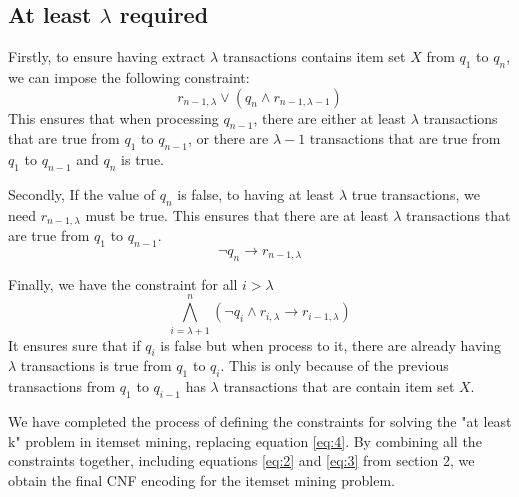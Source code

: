 \subsection{At least $\lambda$ required}

Firstly, to ensure having extract $\lambda$ transactions contains item set $X$ from $q_1$ to $q_n$, we can impose the following constraint:
\begin{equation}
    r_{n-1,\lambda} \vee (q_n \wedge r_{n-1,\lambda-1})
\end{equation}
This ensures that when processing $q_{n-1}$, there are either at least $\lambda$ transactions that are true from $q_1$ to $q_{n-1}$,
or there are $\lambda - 1$ transactions that are true from $q_1$ to $q_{n-1}$ and $q_n$ is true.

Secondly, If the value of $q_n$ is false, to having at least $\lambda$ true transactions,
we need $r_{n-1,\lambda}$ must be true.
This ensures that there are at least $\lambda$ transactions that are true from $q_1$ to $q_{n-1}$.
\begin{equation}
    \neg q_n \rightarrow r_{n-1,\lambda}
\end{equation}

Finally, we have the constraint for all $i > \lambda$
\begin{equation}
    \bigwedge_{i=\lambda + 1}^{n} \left( \neg q_i \wedge r_{i,\lambda} \rightarrow r_{i-1,\lambda} \right)
\end{equation}
It ensures sure that if $q_i$ is false but when process to it, there are already having $\lambda$ transactions is true from $q_1$ to $q_i$.
This is only because of the previous transactions from $q_1$ to $q_{i-1}$ has $\lambda$ transactions that are contain item set $X$.

We have completed the process of defining the constraints for solving the
"at least k" problem in itemset mining, replacing equation \ref{eq:4}.
By combining all the constraints together, including equations \ref{eq:2} and \ref{eq:3} from section 2,
we obtain the final CNF encoding for the itemset mining problem.